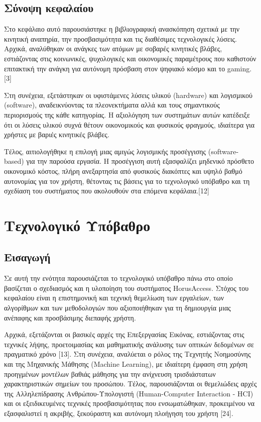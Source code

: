 \documentclass[twoside, a4paper, 11pt]{article}
\newcommand{\textlatin}[1]{\textenglish{#1}}
\begin{document}
\subsection{Σύνοψη κεφαλαίου}
Στο κεφάλαιο αυτό παρουσιάστηκε η βιβλιογραφική ανασκόπηση σχετικά με την κινητική αναπηρία, την
προσβασιμότητα και τις διαθέσιμες τεχνολογικές λύσεις. Αρχικά, αναλύθηκαν οι ανάγκες των ατόμων
με σοβαρές κινητικές βλάβες, εστιάζοντας στις κοινωνικές, ψυχολογικές και οικονομικές παραμέτρους
που καθιστούν επιτακτική την ανάγκη για αυτόνομη πρόσβαση στον ψηφιακό κόσμο και το gaming. [3]

Στη συνέχεια, εξετάστηκαν οι υφιστάμενες λύσεις υλικού (hardware) και λογισμικού (software), αναδεικνύοντας τα πλεονεκτήματα αλλά και τους σημαντικούς περιορισμούς της κάθε κατηγορίας. Η αξιολόγηση των συστημάτων αυτών κατέδειξε ότι οι λύσεις υλικού συχνά θέτουν οικονομικούς και φυσικούς
φραγμούς, ιδιαίτερα για χρήστες με βαριές κινητικές βλάβες.

Τέλος, αιτιολογήθηκε η επιλογή μιας αμιγώς λογισμικής προσέγγισης (software-based) για την παρούσα
εργασία. Η προσέγγιση αυτή εξασφαλίζει μηδενικό πρόσθετο οικονομικό κόστος, πλήρη ανεξαρτησία
από φυσικούς διακόπτες και υψηλό βαθμό αυτονομίας για τον χρήστη, θέτοντας τις βάσεις για το τεχνολογικό υπόβαθρο και τη σχεδίαση του συστήματος που ακολουθούν στα επόμενα κεφάλαια.[12]

\clearpage
\section{Τεχνολογικό Υπόβαθρο}

\subsection{Εισαγωγή}
Σε αυτή την ενότητα παρουσιάζεται το τεχνολογικό υπόβαθρο πάνω στο οποίο βασίζεται ο σχεδιασμός και η υλοποίηση του συστήματος \textlatin{HorusAccess}. Στόχος του κεφαλαίου είναι η επιστημονική και τεχνική θεμελίωση των εργαλείων, των αλγορίθμων και των μεθοδολογιών που αξιοποιήθηκαν για τη δημιουργία μιας ανέπαφης και προσβάσιμης διεπαφής χρήστη.

Αρχικά, εξετάζονται οι βασικές αρχές της Επεξεργασίας Εικόνας, εστιάζοντας στις
τεχνικές λήψης, προετοιμασίας και μαθηματικής ανάλυσης των οπτικών δεδομένων σε πραγματικό χρόνο
[13]. Στη συνέχεια, αναλύεται ο ρόλος της Τεχνητής Νοημοσύνης και της Μηχανικής Μάθησης
(Machine Learning), με ιδιαίτερη έμφαση στη χρήση προηγμένων μοντέλων βαθιάς μάθησης για την
ανίχνευση τρισδιάστατων χαρακτηριστικών σημείων του προσώπου. Τέλος,
παρουσιάζονται οι θεμελιώδεις αρχές της Αλληλεπίδρασης Ανθρώπου-Υπολογιστή (Human-Computer
Interaction - HCI) και οι εξειδικευμένες τεχνικές προσβασιμότητας που ενσωματώθηκαν, προκειμένου
να εξασφαλιστεί η ακριβής, ξεκούραστη και αυτόνομη πλοήγηση του χρήστη [24].
\end{document}
